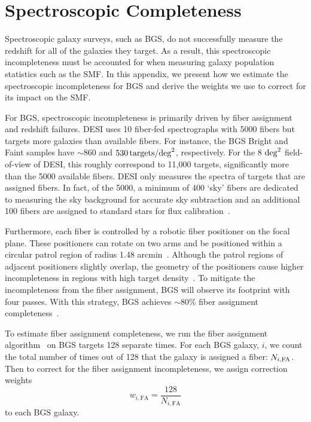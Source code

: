 \section{Spectroscopic Completeness} \label{sec:spec_comp}
Spectroscopic galaxy surveys, such as BGS, do not successfully measure the
redshift for all of the galaxies they target. 
As a result, this spectroscopic incompleteness must be accounted for when
measuring galaxy population statistics such as the SMF.  
In this appendix, we present how we estimate the spectroscopic incompleteness
for BGS and derive the weights we use to correct for its impact on the SMF. 

For BGS, spectroscopic incompleteness is primarily driven by fiber assignment
and redshift failures.  
DESI uses 10 fiber-fed spectrographs with 5000 fibers but targets more galaxies
than available fibers. 
For instance, the BGS Bright and Faint samples have $\sim 860$ and 
$530\,{\rm targets}/{\rm deg}^2$, respectively. 
For the 8 ${\rm deg}^2$ field-of-view of DESI, this roughly correspond to
11,000 targets, significantly more than the 5000 available fibers. 
DESI only measures the spectra of targets that are assigned fibers. 
In fact, of the 5000, a minimum of 400 ‘sky’ fibers are dedicated to measuring
the sky background for accurate sky subtraction and an additional 100 fibers
are assigned to standard stars for flux calibration~\cite{guy2022}.

Furthermore, each fiber is controlled by a robotic fiber positioner on the
focal plane. 
These positioners can rotate on two arms and be positioned within a circular
patrol region of radius 1.48 arcmin~\citep{schubnell2016, desi2016a,2022b, silber2022}.
Although the patrol regions of adjacent positioners slightly overlap, the
geometry of the positioners cause higher incompleteness in regions with high
target density~\citep{smith2019}.
To mitigate the incompleteness from the fiber assignment, BGS will observe its  
footprint with four passes.
With this strategy, BGS achieves $\sim$80\% fiber assignment
completeness~\citep{hahn_bgs}.

To estimate fiber assignment completeness, we run the fiber assignment
algorithm~\citep{raichoor2022} on BGS targets 128 separate times.
For each BGS galaxy, $i$, we count the total number of times out of 128 that
the galaxy is assigned a fiber: $N_{i, {\rm FA}}$. 
Then to correct for the fiber assignment incompleteness, we assign correction
weights
\begin{equation} \label{eq:w_fa}
    w_{i, \mathrm{FA}} = \frac{128}{N_{i, \mathrm{FA}}}
\end{equation}
to each BGS galaxy. 

